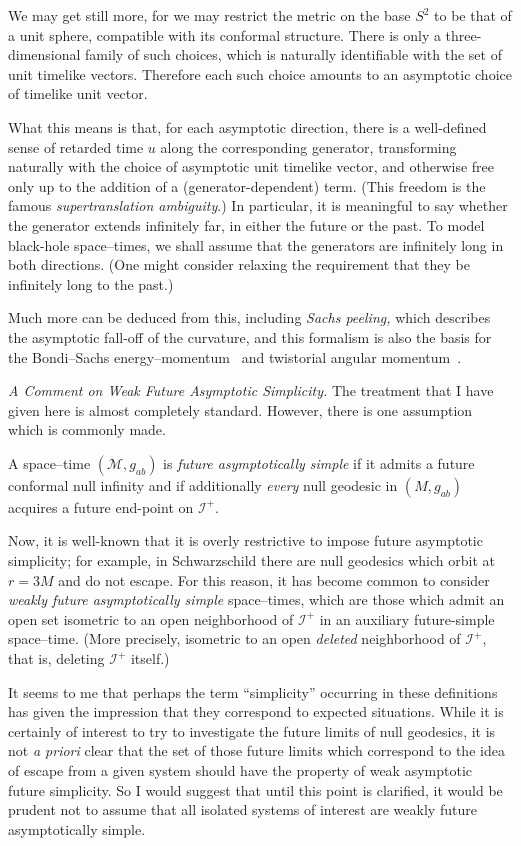 \documentclass[
%
draft    %
,numberedheadings 
,bibliocites
  ]
  {aipproc}
\newcommand{\scrif}{{{\mathscr I}^{+}}}
\newcommand{\MM}{{\mathscr M}}
\begin{document}
We may get still more, for we may restrict the metric on the base $S^2$ to be that of a unit sphere, compatible with its conformal structure.  There is only a three-dimensional family of such choices, which is naturally identifiable with the set of unit timelike vectors.  Therefore each such choice amounts to an asymptotic choice of timelike unit vector.

What this means is that, for each asymptotic direction, there is a well-defined sense of retarded time $u$ along the corresponding generator, transforming naturally with the choice of asymptotic unit timelike vector, and otherwise free only up to the addition of a (generator-dependent) term.
(This freedom is the famous {\em supertranslation ambiguity}.)  In particular, it is meaningful to say whether the generator extends infinitely far, in either the future or the past.  To model 
black-hole space--times, we shall assume that the generators are infinitely long in both directions.  (One might consider relaxing the requirement that they be infinitely long to the past.)

Much more can be deduced from this, including {\em Sachs peeling,} which describes the asymptotic fall-off of the curvature, and this formalism is also the basis for the Bondi--Sachs energy--momentum~\citep{Penrose:1986ca} and twistorial angular momentum~\citep{Helfer:2007}.


{\em A Comment on Weak Future Asymptotic Simplicity.   }
The treatment that I have given here is almost completely standard.  However, there is one assumption which is commonly made.

A space--time $(\MM ,g_{ab})$ is {\em future asymptotically simple} if it admits a future conformal null infinity and if additionally
{\em every} null geodesic in $(M,g_{ab})$ acquires a future end-point on $\scrif$.

Now, it is well-known that it is overly restrictive to impose future asymptotic simplicity; for example, in Schwarzschild there are null geodesics which orbit at $r=3M$ and do not escape.  
For this reason, it has become common to consider {\em weakly future asymptotically simple} space--times, which are those which admit an open set isometric to an open neighborhood of $\scrif$ in an auxiliary future-simple space--time.  (More precisely, isometric to an open {\em deleted} neighborhood of $\scrif$, that is, deleting $\scrif$ itself.)

It seems to me that perhaps the term ``simplicity'' occurring in these definitions has given the impression that they correspond to expected situations.  While it is certainly of interest to try to investigate the future limits of null geodesics, it is not {\em a priori} clear that the set of those future limits which correspond to the idea of escape from a given system should have the property of weak asymptotic future simplicity.  So I would suggest that until this point is clarified, it would be prudent not to assume that all isolated systems of interest are weakly future asymptotically simple. 
\end{document}
